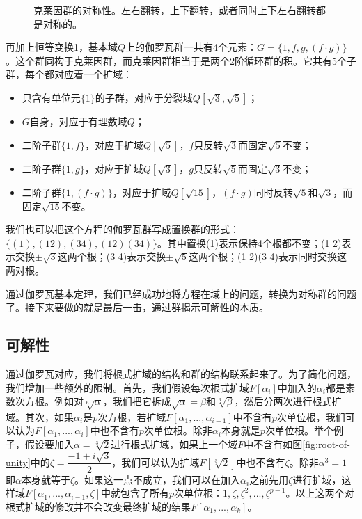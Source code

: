 \documentclass[b5paper]{ctexart}
\begin{document}
\begin{figure}
\centering
{}
\captionsetup{labelformat=empty}
\caption{克莱因群的对称性。左右翻转，上下翻转，或者同时上下左右翻转都是对称的。}
\label{fig:Klein-four-group}
\end{figure}

再加上恒等变换1，基本域$Q$上的伽罗瓦群一共有4个元素：$G = \{1, f, g, (f \cdot g)\}$。这个群同构于克莱因群，而克莱因群相当于是两个2阶循环群的积。它共有5个子群，每个都对应着一个扩域：

\begin{itemize}
\item 只含有单位元$\{1\}$的子群，对应于分裂域$Q[\sqrt{3}, \sqrt{5}]$；
\item $G$自身，对应于有理数域$Q$；
\item 二阶子群$\{1, f\}$，对应于扩域$Q[\sqrt{5}]$，$f$只反转$\sqrt{3}$而固定$\sqrt{5}$不变；
\item 二阶子群$\{1, g\}$，对应于扩域$Q[\sqrt{3}]$，$g$只反转$\sqrt{5}$而固定$\sqrt{3}$不变；
\item 二阶子群$\{1, (f \cdot g)\}$，对应于扩域$Q[\sqrt{15}]$，$(f \cdot g)$同时反转$\sqrt{5}$和$\sqrt{3}$，而固定$\sqrt{15}$不变。
\end{itemize}

我们也可以把这个方程的伽罗瓦群写成置换群的形式：$\{(1), (1 2), (3 4), (1 2)(3 4)\}$。其中置换(1)表示保持4个根都不变；(1 2)表示交换$\pm \sqrt{3}$这两个根；(3 4)表示交换$\pm \sqrt{5}$这两个根；(1 2)(3 4)表示同时交换这两对根。

通过伽罗瓦基本定理，我们已经成功地将方程在域上的问题，转换为对称群的问题了。接下来要做的就是最后一击，通过群揭示可解性的本质。

\subsection{可解性}

通过伽罗瓦对应，我们将根式扩域的结构和群的结构联系起来了。为了简化问题，我们增加一些额外的限制。首先，我们假设每次根式扩域$F[\alpha_i]$中加入的$\alpha_i$都是素数次方根。例如对$\sqrt[6]{\alpha}$，我们把它拆成$\sqrt{\alpha} = \beta$和$\sqrt[3]{\beta}$，然后分两次进行根式扩域。其次，如果$\alpha_i$是$p$次方根，若扩域$F[\alpha_1, ..., \alpha_{i-1}]$中不含有$p$次单位根，我们可以认为$F[\alpha_1, ..., \alpha_i]$中也不含有$p$次单位根。除非$\alpha_i$本身就是$p$次单位根。举个例子，假设要加入$\alpha = \sqrt[3]{2}$进行根式扩域，如果上一个域$F$中不含有如图\ref{fig:root-of-unity}中的$\zeta = \dfrac{-1 + i\sqrt{3}}{2}$，我们可以认为扩域$F[\sqrt[3]{2}]$中也不含有$\zeta$。除非$\alpha^3 = 1$即$\alpha$本身就等于$\zeta$。如果这一点不成立，我们可以在加入$\alpha_i$之前先用$\zeta$进行扩域，这样域$F[\alpha_1, ..., \alpha_{i-1}, \zeta]$中就包含了所有$p$次单位根：$1, \zeta, \zeta^2, ..., \zeta^{p-1}$。以上这两个对根式扩域的修改并不会改变最终扩域的结果$F[\alpha_1, ..., \alpha_k]$。
\end{document}

